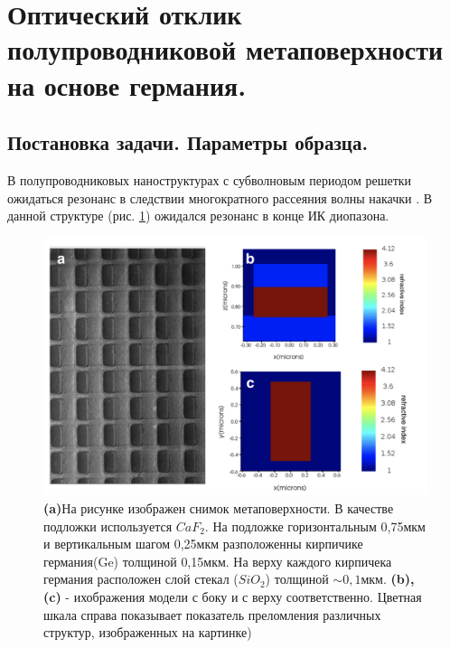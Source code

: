\section{Оптический отклик полупроводниковой метаповерхности на основе германия.}

\subsection{Постановка задачи. Параметры образца.}
В полупроводниковых наноструктурах с субволновым периодом решетки ожидаться резонанс в следствии многократного рассеяния  волны накачки \cite{mftiOpt}. В данной структуре (рис. \ref{base1}) ожидался резонанс в конце ИК диопазона.

\begin{figure}[h]
	\centering
    \includegraphics[width=0.8\linewidth]{images/base1.png}
	\caption{\textbf{(a)}На рисунке изображен снимок метаповерхности. В качестве подложки используется $CaF_2$. На подложке  горизонтальным  0,75мкм и вертикальным шагом 0,25мкм разположенны кирпичике германия(Ge) толщиной 0,15мкм. На верху каждого кирпичека германия расположен слой стекал ($SiO_2$) толщиной $\sim 0,1$мкм. \textbf{(b), (c)} - ихображения модели с боку и с верху соответственно. Цветная шкала справа показывает показатель преломления различных структур, изображенных на картинке)}
	\label{base1}
\end{figure}

